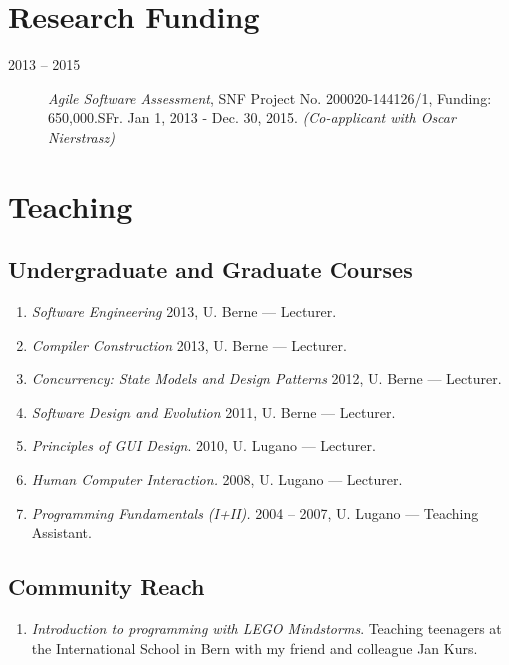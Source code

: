 \documentclass[a4paper]{article}
\begin{document}



\section {Research Funding}
\begin{description}
\item [2013 -- 2015] {\em Agile Software Assessment}, SNF Project No. 200020-144126/1, Funding: 650,000.SFr.
Jan 1, 2013 - Dec. 30, 2015. {\em (Co-applicant with Oscar Nierstrasz)}
\end{description}






\section{Teaching}
\subsection{Undergraduate and Graduate Courses}
\begin{enumerate}
	\item {\em Software Engineering} 2013, U. Berne --- Lecturer.
	\item {\em Compiler Construction} 2013, U. Berne --- Lecturer.
	\item {\em Concurrency: State Models and Design Patterns} 2012, U. Berne --- Lecturer.
	\item {\em Software Design and Evolution} 2011, U. Berne --- Lecturer.
	\item {\em Principles of GUI Design}. 2010, U. Lugano --- Lecturer.
	\item {\em Human Computer Interaction.} 2008, U. Lugano --- Lecturer.
	\item {\em Programming Fundamentals (I+II).} 2004 -- 2007, U. Lugano --- Teaching Assistant.
\end{enumerate}



\subsection {Community Reach}
\begin{enumerate}
	\item \emph{Introduction to programming with LEGO Mindstorms}. Teaching teenagers at the International School in Bern with my friend and colleague Jan Kurs.
\end{enumerate}
\end{document}
